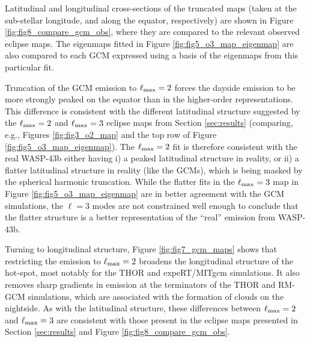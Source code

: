 \documentclass[twocolumn]{aastex631}
\begin{document}
Latitudinal and longitudinal cross-sections of the truncated maps (taken at the sub-stellar longitude, and along the equator, respectively) are shown in Figure \ref{fig:fig8_compare_gcm_obs}, where they are compared to the relevant observed eclipse maps. The eigenmaps fitted in Figure \ref{fig:fig5_o3_map_eigenmap} are also compared to each GCM expressed using a basis of the eigenmaps from this particular fit. 

Truncation of the GCM emission to $\ell_{\rm max}=2$ forces the dayside emission to be more strongly peaked on the equator than in the higher-order representations. This difference is consistent with the different latitudinal structure suggested by the $\ell_{\rm max}=2$ and $\ell_{\rm max}=3$ eclipse maps from Section \ref{sec:results} (comparing, e.g., Figures \ref{fig:fig3_o2_map} and the top row of Figure \ref{fig:fig5_o3_map_eigenmap}). The $\ell_{\rm max}=2$ fit is therefore consistent with the real WASP-43b either having i) a peaked latitudinal structure in reality, or ii) a flatter latitudinal structure in reality (like the GCMs), which is being masked by the spherical harmonic truncation. While the flatter fits in the $\ell_{\rm max}=3$ map in Figure \ref{fig:fig5_o3_map_eigenmap} are in better agreement with the GCM simulations, the $\ell=3$ modes are not constrained well enough to conclude that the flatter structure is a better representation of the ``real'' emission from WASP-43b. 

Turning to longitudinal structure, Figure \ref{fig:fig7_gcm_maps} shows that restricting the emission to $\ell_{\rm max}=2$ broadens the longitudinal structure of the hot-spot, most notably for the THOR and expeRT/MITgcm simulations. It also removes sharp gradients in emission at the terminators of the THOR and RM-GCM simulations, which are associated with the formation of clouds on the nightside. As with the latitudinal structure, these differences between $\ell_{\rm max}=2$ and $\ell_{\rm max}=3$ are consistent with those present in the eclipse maps presented in Section \ref{sec:results} and Figure \ref{fig:fig8_compare_gcm_obs}.
\end{document}
